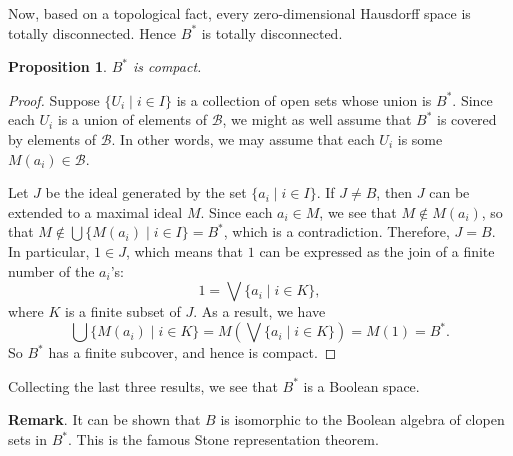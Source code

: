 \documentclass[12pt]{article}
\newtheorem{prop}{Proposition}
\begin{document}
Now, based on a topological fact, every zero-dimensional Hausdorff space is totally disconnected.  Hence $B^*$ is totally disconnected.

\begin{prop} $B^*$ is compact. \end{prop}
\begin{proof} Suppose $\lbrace U_i \mid i\in I\rbrace$ is a collection of open sets whose union is $B^*$.  Since each $U_i$ is a union of elements of $\mathcal{B}$, we might as well assume that $B^*$ is covered by elements of $\mathcal{B}$.  In other words, we may assume that each $U_i$ is some $M(a_i)\in \mathcal{B}$.  

Let $J$ be the ideal generated by the set $\lbrace a_i\mid i\in I\rbrace$.  If $J\ne B$, then $J$ can be extended to a maximal ideal $M$.  Since each $a_i\in M$, we see that $M\notin M(a_i)$, so that $M \notin \bigcup \lbrace M(a_i) \mid i\in I\rbrace = B^*$, which is a contradiction.  Therefore, $J=B$.  In particular, $1\in J$, which means that $1$ can be expressed as the join of a finite number of the $a_i$'s: $$1= \bigvee \lbrace a_i \mid i \in K\rbrace,$$ where $K$ is a finite subset of $J$.  As a result, we have $$\bigcup \lbrace M(a_i)\mid i\in K\rbrace = M(\bigvee \lbrace a_i \mid i\in K \rbrace )=M(1)=B^*.$$
So $B^*$ has a finite subcover, and hence is compact.
\end{proof}

Collecting the last three results, we see that $B^*$ is a Boolean space.

\textbf{Remark}.  It can be shown that $B$ is isomorphic to the Boolean algebra of clopen sets in $B^*$.  This is the famous Stone representation theorem.
\end{document}
